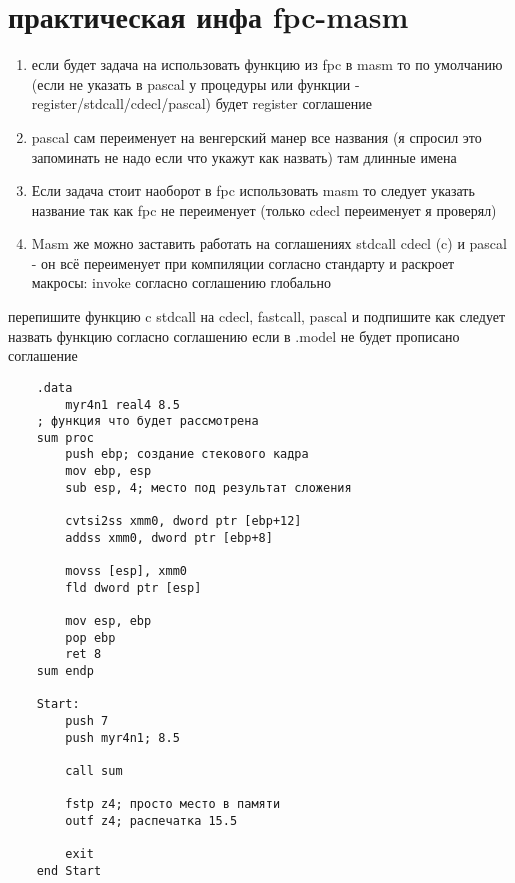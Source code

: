 \documentclass[a4paper,10pt]{article}
\begin{document}
\section*{практическая инфа fpc-masm}
\begin{enumerate}
    \item если будет задача на использовать функцию из fpc в masm то по умолчанию (если не указать в pascal у процедуры или функции - register/stdcall/cdecl/pascal) будет register соглашение
    \item pascal сам переименует на венгерский манер все названия (я спросил это запоминать не надо если что укажут как назвать) там длинные имена
    \item Если задача стоит наоборот в fpc использовать masm то следует указать название так как fpc не переименует (только cdecl переименует я проверял)
    \item Masm же можно заставить работать на соглашениях stdcall cdecl (c) и pascal - он всё переименует при компиляции согласно стандарту и раскроет макросы: invoke согласно соглашению глобально
\end{enumerate}
перепишите функцию c stdcall на cdecl, fastcall, pascal и подпишите как следует назвать функцию согласно соглашению если в .model не будет прописано соглашение
\begin{verbatim}
    .data 
        myr4n1 real4 8.5
    ; функция что будет рассмотрена
    sum proc
        push ebp; создание стекового кадра
        mov ebp, esp
        sub esp, 4; место под результат сложения
    
        cvtsi2ss xmm0, dword ptr [ebp+12]
        addss xmm0, dword ptr [ebp+8]
    
        movss [esp], xmm0
        fld dword ptr [esp]
    
        mov esp, ebp
        pop ebp
        ret 8
    sum endp
    
    Start:
        push 7
        push myr4n1; 8.5
    
        call sum
    
        fstp z4; просто место в памяти
        outf z4; распечатка 15.5
    
        exit
    end Start
\end{verbatim}
\end{document}
